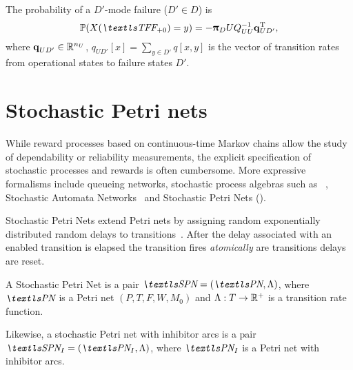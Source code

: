 The probability of a $D'$-mode failure ($D' \in D$) is
\begin{equation}
  \label{eq:background:failure-mode}
  \Pr(X(\TFF_{+ 0}) = y) = - \vec{\uppi}_DUQ_{UU}^{-1} \vec{q}_{UD'}^\T \text,
\end{equation}
where $\bm{\mathrm{q}}_{UD'} \in \mathbb{R}^{n_U}$,
$q_{UD'}[x] = \sum_{y \in D'} q[x, y]$ is the vector of transition
rates from operational states to failure states $D'$.

\section{Stochastic Petri nets}

While reward processes based on continuous-time Markov chains allow
the study of dependability or reliability measurements, the explicit
specification of stochastic processes and rewards is often
cumbersome. More expressive formalisms include queueing networks,
stochastic process algebras such as
~\citep{DBLP:conf/cpe/GilmoreH94,donatelli1993superposed},
Stochastic Automata Networks~\citep{DBLP:conf/mascots/FernandesPS95}
and Stochastic Petri Nets ().

Stochastic Petri Nets extend Petri nets by assigning random
exponentially distributed random delays to
transitions~\citep{DBLP:conf/apn/Marsan88}. After the delay associated
with an enabled transition is elapsed the transition fires
\emph{atomically} are transitions delays are reset.

\begin{dfn}
  \label{dfn:background:spn}
  A Stochastic Petri Net is a pair $\SPN = (\PN, \Lambda)$, where
  $\PN$ is a Petri net $(P, T, F, W, M_0)$ and $\Lambda: T \to \mathbb{R}^{+}$
  is a transition rate function.

  Likewise, a stochastic Petri net with inhibitor arcs is a pair
  $\SPN_I = (\PN_I, \Lambda)$, where $\PN_I$ is a Petri net with
  inhibitor arcs.
\end{dfn}

\needspace{5ex}

